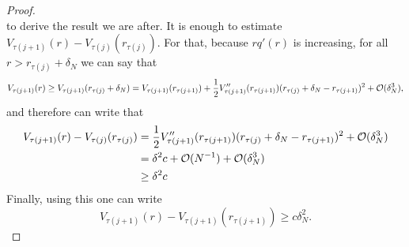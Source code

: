\begin{proof}
\begin{equation}
\end{equation}
to derive the result we are after. It is enough to estimate $V_{\tau(j+1)}(r) - V_{\tau(j)}(r_{\tau(j)})$. For that, because $r q'(r)$ is increasing, for all $r > r_{\tau(j)} + \delta_N$ we can say that
\begin{equation}
	V_{\tau(j+1)}(r) \geq V_{\tau(j+1)}(r_{\tau(j)} + \delta_N) =  V_{\tau(j+1)}(r_{\tau(j+1)}) + \frac{1}{2} V''_{\tau(j+1)}(r_{\tau(j+1)}) (r_{\tau(j)} + \delta_N - r_{\tau(j+1)})^2 + \mathcal{O}(\delta_N^3),
\end{equation} 
and therefore can write that
\begin{align}
	V_{\tau(j+1)}(r) - V_{\tau(j)}(r_{\tau(j)}) & =  \frac{1}{2} V''_{\tau(j+1)}(r_{\tau(j+1)}) (r_{\tau(j)} + \delta_N - r_{\tau(j+1)})^2 + \mathcal{O}(\delta_N^3) \\
	& = \delta^2 c + \mathcal{O}(N^{-1}) + \mathcal{O}(\delta_N^3) \\
	& \geq  \delta^2 c
\end{align}
Finally, using this one can write
\begin{equation}
	V_{\tau(j+1)}(r) - V_{\tau(j+1)}(r_{\tau(j+1)}) \geq c \delta_N^2.
\end{equation}



\end{proof}
